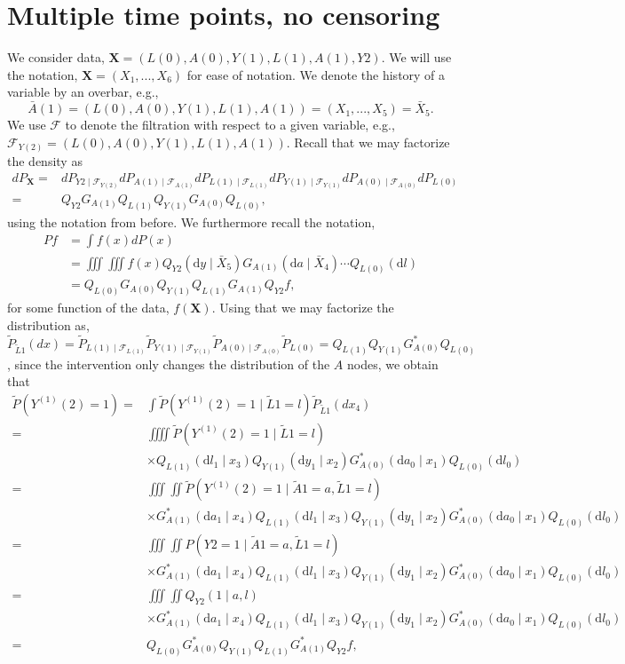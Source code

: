 \documentclass{article}
\newcommand{\A}{A}
\renewcommand{\L}{L}
\newcommand{\Y}{Y}
\newcommand{\Ystar}[2]{Y^{(#1)}(#2)}
\newcommand{\F}[2]{\mathcal{F}_{#1(#2)}}
\newcommand{\Lbar}{\tilde{L}}
\newcommand{\Abar}{\tilde{A}}
\renewcommand{\d}{\ensuremath{\mathrm{d}}}
\begin{document}
\section{Multiple time points, no censoring}
We consider data, $\textbf{X}=(\L(0),\A(0),\Y(1),\L(1),\A(1),\Y{2}).$ We will use the notation, $\textbf{X}=(X_1,...,X_6)$ for ease of notation. We denote the history of a variable by an overbar, e.g., $$\bar{A}(1)=(\L(0),\A(0),\Y(1),\L(1),\A(1))=(X_1,...,X_5)=\bar{X}_5.$$ We use $\mathcal{F}$ to denote the filtration with respect to a given variable, e.g., $\F{Y}{2}=(\L(0),\A(0),\Y(1),\L(1),\A(1))$. Recall that we may factorize the density as 
\begin{align*}
dP_{\textbf{X}}=&dP_{\Y{2}\mid \F{Y}{2}}dP_{\A(1)\mid \F{A}{1}}dP_{\L(1)\mid \F{L}{1}}dP_{\Y(1)\mid \F{Y}{1}}dP_{\A(0)\mid \F{A}{0}}dP_{\L(0)}\\
=&Q_{\Y{2}}G_{\A(1)}Q_{\L(1)}Q_{\Y(1)}G_{\A(0)}Q_{\L(0)},
\end{align*}
using the notation from before. We furthermore recall the notation,
\begin{align*}
    Pf&=\int f(x) dP(x)\\&=\iiint\!\!\!\iiint f(x) Q_{\Y{2}}(\d y\mid \bar{X}_5)G_{\A(1)}(\d a\mid \bar{X}_4)\cdots Q_{\L(0)}(\d l)\\&=Q_{\L(0)}G_{\A(0)}Q_{\Y(1)}Q_{\L(1)}G_{\A(1)}Q_{\Y{2}}f,
\end{align*}
for some function of the data, $f(\textbf{X}).$ Using that we may factorize the distribution as, $\tilde{P}_{\Lbar{1}}(dx)=\tilde{P}_{\L(1)\mid \F{L}{1}}\tilde{P}_{\Y(1)\mid \F{Y}{1}}\tilde{P}_{\A(0)\mid \F{A}{0}}\tilde{P}_{\L(0)}=Q_{\L(1)}Q_{\Y(1)}G^*_{\A(0)}Q_{\L(0)}$, since the intervention only changes the distribution of the $A$ nodes, we obtain that
\begin{align*}
  \tilde{P}(\Ystar{1}{2}=1)=&\int\tilde{P}(\Ystar{1}{2}=1\mid\Lbar{1} = l)\tilde{P}_{\Lbar{1}}(dx_4)\\
  =&\iiiint\tilde{P}(\Ystar{1}{2}=1\mid\Lbar{1} = l)\\
                            &\times Q_{\L(1)}(\d l_1\mid x_3)Q_{\Y(1)}(\d y_1\mid x_2)G^*_{\A(0)}(\d a_0\mid x_1)Q_{\L(0)}(\d l_0)\\
  =&\iiint\!\!\!\iint\tilde{P}(\Ystar{1}{2}=1\mid\Abar{1}=a,\Lbar{1} = l)\\
                            &\times G^*_{\A(1)}(\d a_1\mid x_4)Q_{\L(1)}(\d l_1\mid x_3)Q_{\Y(1)}(\d y_1\mid x_2)G^*_{\A(0)}(\d a_0\mid x_1)Q_{\L(0)}(\d l_0)\\
  =&\iiint\!\!\!\iint P(\Y{2}=1\mid\Abar{1}=a,\Lbar{1} = l)\\
                            &\times G^*_{\A(1)}(\d a_1\mid x_4)Q_{\L(1)}(\d l_1\mid x_3)Q_{\Y(1)}(\d y_1\mid x_2) G^*_{\A(0)}(\d a_0\mid x_1)Q_{\L(0)}(\d l_0)\\
  =&\iiint\!\!\!\iint  Q_{\Y{2}}(1\mid a, l)\\
                            &\times G^*_{\A(1)}(\d a_1\mid x_4)Q_{\L(1)}(\d l_1\mid x_3)Q_{\Y(1)}(\d y_1\mid x_2) G^*_{\A(0)}(\d a_0\mid x_1)Q_{\L(0)}(\d l_0)\\
  =&Q_{\L(0)}G^*_{\A(0)}Q_{\Y(1)}Q_{\L(1)}G^*_{\A(1)}Q_{\Y{2}}f,
\end{align*}
\end{document}
